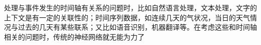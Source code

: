 \documentclass[preview]{standalone}
\begin{document}
\begin{center}
处理与事件发生的时间轴有关系的问题时，比如自然语言处理，文本处理，文字的上下文是有一定的关联性的；时间序列数据，如连续几天的气状况，当日的天气情况与过去的几天有某些联系；又比如语音识别，机器翻译等。在考虑这些和时间轴相关的问题时，传统的神经网络就无能为力了
\end{center}
\end{document}
